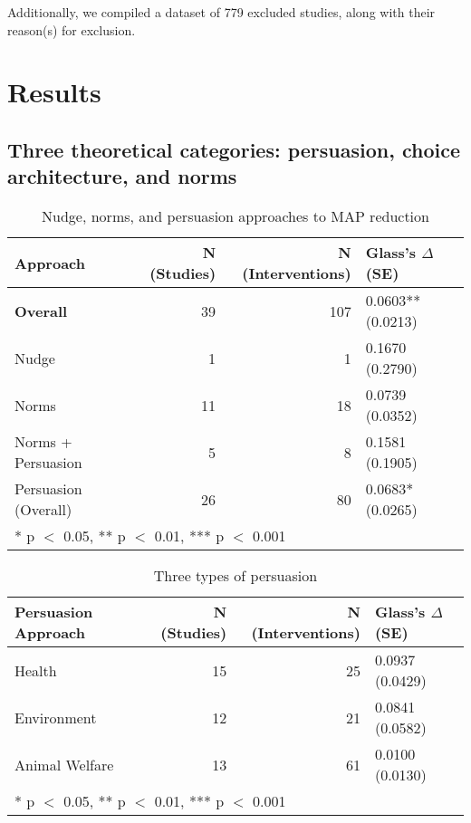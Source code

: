 \documentclass[sn-nature,pdflatex]{sn-jnl}
\begin{document}
Additionally, we compiled a dataset of 779 excluded studies, along with
their reason(s) for exclusion.

\section{Results}\label{sec2}

\subsection{Three theoretical categories: persuasion, choice
architecture, and
norms}\label{three-theoretical-categories-persuasion-choice-architecture-and-norms}

\begin{table}[!h]
\centering
\caption{\label{tab:tab:table_one}Nudge, norms, and persuasion approaches to MAP reduction}
\centering
\begin{tabular}[t]{lrrl}
\toprule
Approach & N (Studies) & N (Interventions) & Glass's $\Delta$ (SE)\\
\midrule
\textbf{Overall} & 39 & 107 & 0.0603** (0.0213)\\
Nudge & 1 & 1 & 0.1670 (0.2790)\\
Norms & 11 & 18 & 0.0739 (0.0352)\\
Norms + Persuasion & 5 & 8 & 0.1581 (0.1905)\\
Persuasion (Overall) & 26 & 80 & 0.0683* (0.0265)\\
\bottomrule
\multicolumn{4}{l}{\rule{0pt}{1em}* p $<$ 0.05, ** p $<$ 0.01, *** p $<$ 0.001}\\
\end{tabular}
\end{table}

\begin{table}[!h]
\centering
\caption{\label{tab:tab:table_two}Three types of persuasion}
\centering
\begin{tabular}[t]{lrrl}
\toprule
Persuasion Approach & N (Studies) & N (Interventions) & Glass's $\Delta$ (SE)\\
\midrule
Health & 15 & 25 & 0.0937 (0.0429)\\
Environment & 12 & 21 & 0.0841 (0.0582)\\
Animal Welfare & 13 & 61 & 0.0100 (0.0130)\\
\bottomrule
\multicolumn{4}{l}{\rule{0pt}{1em}* p $<$ 0.05, ** p $<$ 0.01, *** p $<$ 0.001}\\
\end{tabular}
\end{table}
\end{document}

